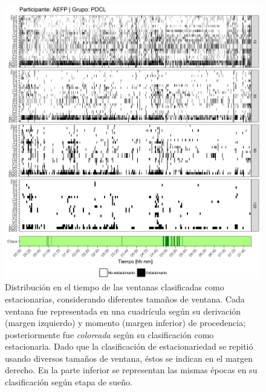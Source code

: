 \begin{figure}
\centering
\includegraphics[width=\linewidth]
{./scripts_graf_res/AEFP_patrones_2.png}
\caption[Distribución en el tiempo de las ventanas clasificadas como estacionarias, considerando diferentes tamaños de ventana]{Distribución en el tiempo de las ventanas clasificadas como estacionarias, considerando diferentes tamaños de ventana. 
Cada ventana fue representada en una cuadrícula según su derivación (margen izquierdo) y momento (margen inferior) de procedencia; posteriormente fue \textit{coloreada} según su clasificación como estacionaria.
Dado que la clasificación de estacionariedad se repitió usando diversos tamaños de ventana, éstos se indican en el margen derecho.
En la parte inferior se representan las mismas épocas en su clasificación según etapa de sueño.}
\end{figure}


